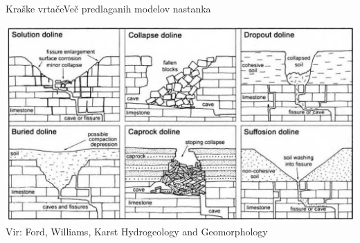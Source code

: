 \documentclass{beamer}
\begin{document}
\begin{frame}{Kraške vrtače}{Več predlaganih modelov nastanka}
  \begin{center}
    \hspace*{-0.075\textwidth}\includegraphics[width=1.10\textwidth]{slike/nastanek}
  \tiny{\\Vir: Ford, Williams, Karst Hydrogeology and Geomorphology}
  \end{center}
\end{frame}

\end{document}
